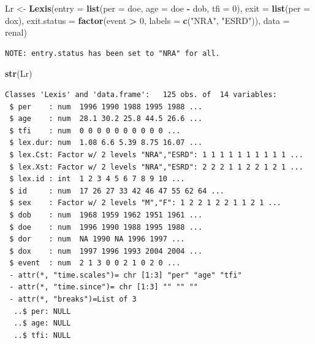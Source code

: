 \documentclass[
]{book}
\newenvironment{Shaded}{\begin{snugshade}}{\end{snugshade}}
\newcommand{\AttributeTok}[1]{\textcolor[rgb]{0.13,0.29,0.53}{#1}}
\newcommand{\DecValTok}[1]{\textcolor[rgb]{0.00,0.00,0.81}{#1}}
\newcommand{\FunctionTok}[1]{\textcolor[rgb]{0.13,0.29,0.53}{\textbf{#1}}}
\newcommand{\NormalTok}[1]{#1}
\newcommand{\OtherTok}[1]{\textcolor[rgb]{0.56,0.35,0.01}{#1}}
\newcommand{\SpecialCharTok}[1]{\textcolor[rgb]{0.81,0.36,0.00}{\textbf{#1}}}
\newcommand{\StringTok}[1]{\textcolor[rgb]{0.31,0.60,0.02}{#1}}
\theoremstyle{definition}
\theoremstyle{definition}
\theoremstyle{definition}
\theoremstyle{definition}
\theoremstyle{remark}
\begin{document}
\begin{enumerate}
\begin{Shaded}
\begin{Highlighting}[]
\NormalTok{Lr }\OtherTok{\textless{}{-}} \FunctionTok{Lexis}\NormalTok{(}\AttributeTok{entry =} \FunctionTok{list}\NormalTok{(}\AttributeTok{per =}\NormalTok{ doe,}
                         \AttributeTok{age =}\NormalTok{ doe }\SpecialCharTok{{-}}\NormalTok{ dob,}
                         \AttributeTok{tfi =} \DecValTok{0}\NormalTok{),}
             \AttributeTok{exit =} \FunctionTok{list}\NormalTok{(}\AttributeTok{per =}\NormalTok{ dox),}
      \AttributeTok{exit.status =} \FunctionTok{factor}\NormalTok{(event }\SpecialCharTok{\textgreater{}} \DecValTok{0}\NormalTok{, }\AttributeTok{labels =} \FunctionTok{c}\NormalTok{(}\StringTok{"NRA"}\NormalTok{, }\StringTok{"ESRD"}\NormalTok{)),}
             \AttributeTok{data =}\NormalTok{ renal)}
\end{Highlighting}
\end{Shaded}

\begin{verbatim}
NOTE: entry.status has been set to "NRA" for all.
\end{verbatim}

\begin{Shaded}
\begin{Highlighting}[]
\FunctionTok{str}\NormalTok{(Lr)}
\end{Highlighting}
\end{Shaded}

\begin{verbatim}
Classes 'Lexis' and 'data.frame':   125 obs. of  14 variables:
 $ per    : num  1996 1990 1988 1995 1988 ...
 $ age    : num  28.1 30.2 25.8 44.5 26.6 ...
 $ tfi    : num  0 0 0 0 0 0 0 0 0 0 ...
 $ lex.dur: num  1.08 6.6 5.39 8.75 16.07 ...
 $ lex.Cst: Factor w/ 2 levels "NRA","ESRD": 1 1 1 1 1 1 1 1 1 1 ...
 $ lex.Xst: Factor w/ 2 levels "NRA","ESRD": 2 2 2 1 1 2 2 1 2 1 ...
 $ lex.id : int  1 2 3 4 5 6 7 8 9 10 ...
 $ id     : num  17 26 27 33 42 46 47 55 62 64 ...
 $ sex    : Factor w/ 2 levels "M","F": 1 2 2 1 2 2 1 1 2 1 ...
 $ dob    : num  1968 1959 1962 1951 1961 ...
 $ doe    : num  1996 1990 1988 1995 1988 ...
 $ dor    : num  NA 1990 NA 1996 1997 ...
 $ dox    : num  1997 1996 1993 2004 2004 ...
 $ event  : num  2 1 3 0 0 2 1 0 2 0 ...
 - attr(*, "time.scales")= chr [1:3] "per" "age" "tfi"
 - attr(*, "time.since")= chr [1:3] "" "" ""
 - attr(*, "breaks")=List of 3
  ..$ per: NULL
  ..$ age: NULL
  ..$ tfi: NULL
\end{verbatim}


\end{enumerate}
\end{document}
